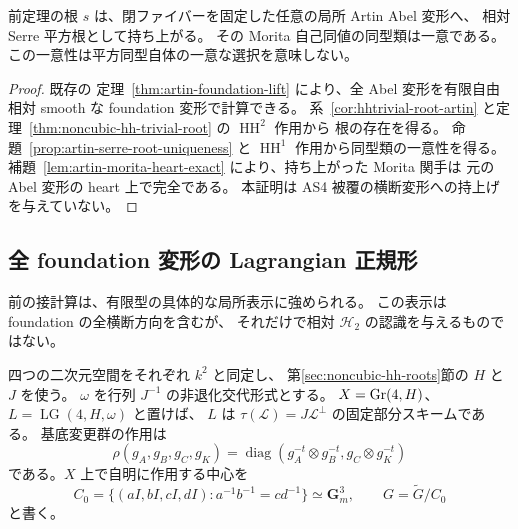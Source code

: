 \begin{corollary}\label{cor:noncubic-root-all-artin}
前定理の根 $s$ は、閉ファイバーを固定した任意の局所 Artin Abel 変形へ、
相対 Serre 平方根として持ち上がる。
その Morita 自己同値の同型類は一意である。
この一意性は平方同型自体の一意な選択を意味しない。
\end{corollary}
\begin{proof}
既存の 定理~\ref{thm:artin-foundation-lift} により、全 Abel 変形を有限自由相対 smooth な
foundation 変形で計算できる。
系~\ref{cor:hhtrivial-root-artin} と定理~\ref{thm:noncubic-hh-trivial-root} の $\operatorname{HH}^2$ 作用から
根の存在を得る。
命題~\ref{prop:artin-serre-root-uniqueness} と $\operatorname{HH}^1$ 作用から同型類の一意性を得る。
補題~\ref{lem:artin-morita-heart-exact} により、持ち上がった Morita 関手は
元の Abel 変形の heart 上で完全である。
本証明は AS4 被覆の横断変形への持上げを与えていない。
\end{proof}

\subsection{全 foundation 変形の Lagrangian 正規形}
\label{subsec:noncubic-lagrangian-slice}

前の接計算は、有限型の具体的な局所表示に強められる。
この表示は foundation の全横断方向を含むが、
それだけで相対 $\mathcal H_2$ の認識を与えるものではない。

四つの二次元空間をそれぞれ $k^2$ と同定し、
第\ref{sec:noncubic-hh-roots}節の $H$ と $J$ を使う。
$\omega$ を行列 $J^{-1}$ の非退化交代形式とする。
$X=\operatorname{Gr}(4,H)$、$L=\operatorname{LG}(4,H,\omega)$ と置けば、
$L$ は $\tau(\mathscr L)=J\mathscr L^\perp$ の固定部分スキームである。
基底変更群の作用は
\[
 \rho(g_A,g_B,g_C,g_K)
 =\operatorname{diag}(g_A^{-t}\otimes g_B^{-t},
                      g_C\otimes g_K^{-t})
\]
である。$X$ 上で自明に作用する中心を
\[
 C_0=\{(aI,bI,cI,dI):a^{-1}b^{-1}=cd^{-1}\}
       \simeq\mathbf G_m^3,
 \qquad G=\widetilde G/C_0
\]
と書く。

